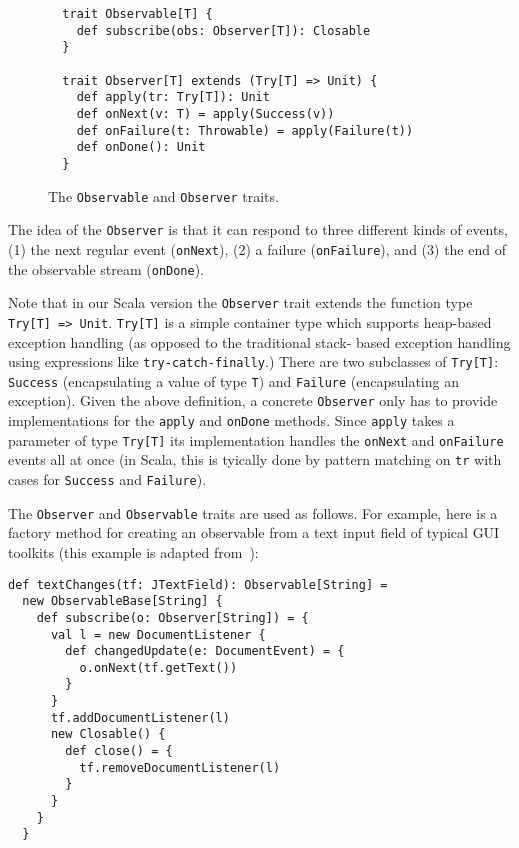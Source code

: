 \documentclass{acm_proc_article-sp}
\begin{document}
\begin{figure}[ht!]
  \centering
  \lstset{numbers=none,xleftmargin=0em}
  \begin{lstlisting}
  trait Observable[T] {
    def subscribe(obs: Observer[T]): Closable
  }

  trait Observer[T] extends (Try[T] => Unit) {
    def apply(tr: Try[T]): Unit
    def onNext(v: T) = apply(Success(v))
    def onFailure(t: Throwable) = apply(Failure(t))
    def onDone(): Unit
  }
  \end{lstlisting}
  \caption{The \texttt{Observable} and \texttt{Observer} traits.}
  \label{fig:observable-observer}
\end{figure}

The idea of the \verb|Observer| is that it can respond to three different
kinds of events, (1) the next regular event (\verb|onNext|), (2) a failure
(\verb|onFailure|), and (3) the end of the observable stream (\verb|onDone|).

Note that in our Scala version the \verb|Observer| trait extends the function
type \verb|Try[T] => Unit|. \verb|Try[T]| is a simple container type which
supports heap-based exception handling (as opposed to the traditional stack-
based exception handling using expressions like \verb|try-catch-finally|.)
There are two subclasses of \verb|Try[T]|: \verb|Success| (encapsulating a
value of type \verb|T|) and \verb|Failure| (encapsulating an exception). Given
the above definition, a concrete \verb|Observer| only has to provide
implementations for the \verb|apply| and \verb|onDone| methods. Since
\verb|apply| takes a parameter of type \verb|Try[T]| its implementation
handles the \verb|onNext| and \verb|onFailure| events all at once (in Scala,
this is tyically done by pattern matching on \verb|tr| with cases for
\verb|Success| and \verb|Failure|).

The \verb|Observer| and \verb|Observable| traits are used as follows. For
example, here is a factory method for creating an observable from a text input
field of typical GUI toolkits (this example is adapted from~\cite{RxCACM}):

\lstset{numbers=none,xleftmargin=0em}
\begin{lstlisting}
def textChanges(tf: JTextField): Observable[String] =
  new ObservableBase[String] {
    def subscribe(o: Observer[String]) = {
      val l = new DocumentListener {
        def changedUpdate(e: DocumentEvent) = {
          o.onNext(tf.getText())
        }
      }
      tf.addDocumentListener(l)
      new Closable() {
        def close() = {
          tf.removeDocumentListener(l)
        }
      }
    }
  }
\end{lstlisting}
\end{document}
